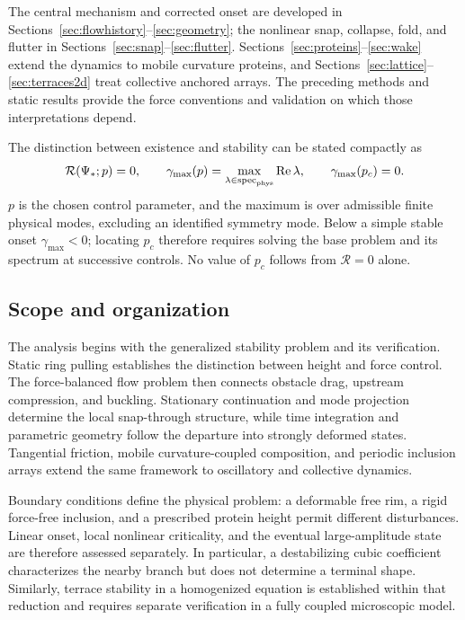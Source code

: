 The central mechanism and corrected onset are developed in Sections~\ref{sec:flowhistory}--\ref{sec:geometry}; the nonlinear snap, collapse, fold, and flutter in Sections~\ref{sec:snap}--\ref{sec:flutter}. Sections~\ref{sec:proteins}--\ref{sec:wake} extend the dynamics to mobile curvature proteins, and Sections~\ref{sec:lattice}--\ref{sec:terraces2d} treat collective anchored arrays. The preceding methods and static results provide the force conventions and validation on which those interpretations depend.


The distinction between existence and stability can be stated compactly as
\begin{equation}
\mathcal R(\Psi_*;p)=0,\qquad
\gamma_{\max}(p)=\max_{\lambda\in\mathrm{spec}_{\rm phys}}\operatorname{Re}\lambda,
\qquad \gamma_{\max}(p_c)=0.
\label{eq:onset-definition}
\end{equation}
$p$ is the chosen control parameter, and the maximum is over admissible finite physical modes, excluding an identified symmetry mode. Below a simple stable onset $\gamma_{\max}<0$; locating $p_c$ therefore requires solving the base problem and its spectrum at successive controls. No value of $p_c$ follows from $\mathcal R=0$ alone.

\subsection{Scope and organization}
The analysis begins with the generalized stability problem and its verification. Static ring pulling establishes the distinction between height and force control. The force-balanced flow problem then connects obstacle drag, upstream compression, and buckling. Stationary continuation and mode projection determine the local snap-through structure, while time integration and parametric geometry follow the departure into strongly deformed states. Tangential friction, mobile curvature-coupled composition, and periodic inclusion arrays extend the same framework to oscillatory and collective dynamics.

Boundary conditions define the physical problem: a deformable free rim, a rigid force-free inclusion, and a prescribed protein height permit different disturbances. Linear onset, local nonlinear criticality, and the eventual large-amplitude state are therefore assessed separately. In particular, a destabilizing cubic coefficient characterizes the nearby branch but does not determine a terminal shape. Similarly, terrace stability in a homogenized equation is established within that reduction and requires separate verification in a fully coupled microscopic model.

